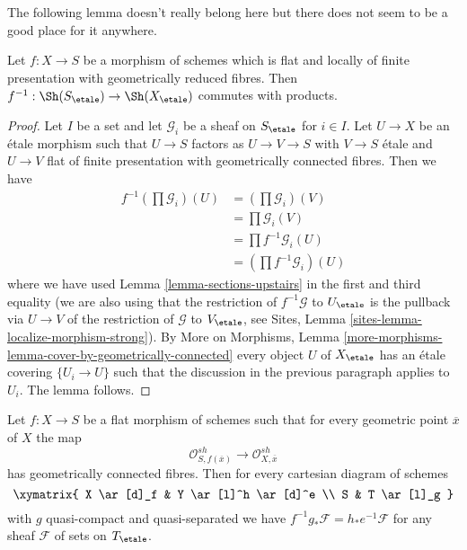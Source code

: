 \noindent
The following lemma doesn't really belong here but there does not
seem to be a good place for it anywhere.

\begin{lemma}
\label{lemma-fppf-reduced-fibres-pullback-products}
Let $f : X \to S$ be a morphism of schemes which is flat and
locally of finite presentation with geometrically reduced fibres.
Then $f^{-1} : \Sh(S_\etale) \to \Sh(X_\etale)$ commutes
with products.
\end{lemma}

\begin{proof}
Let $I$ be a set and let $\mathcal{G}_i$ be a sheaf on $S_\etale$
for $i \in I$.
Let $U \to X$ be an \'etale morphism such that $U \to S$ factors as
$U \to V \to S$ with $V \to S$ \'etale and $U \to V$ flat of finite
presentation with geometrically connected fibres. Then we have
\begin{align*}
f^{-1}(\prod \mathcal{G}_i)(U)
& =
(\prod \mathcal{G}_i)(V) \\
& =
\prod \mathcal{G}_i(V) \\
& =
\prod f^{-1}\mathcal{G}_i(U) \\
& =
(\prod f^{-1}\mathcal{G}_i)(U)
\end{align*}
where we have used Lemma \ref{lemma-sections-upstairs}
in the first and third equality
(we are also using that the restriction of $f^{-1}\mathcal{G}$
to $U_\etale$ is the pullback via $U \to V$ of the restriction of
$\mathcal{G}$ to $V_\etale$, see
Sites, Lemma \ref{sites-lemma-localize-morphism-strong}).
By More on Morphisms, Lemma
\ref{more-morphisms-lemma-cover-by-geometrically-connected}
every object $U$ of $X_\etale$ has an \'etale covering
$\{U_i \to U\}$ such that the discussion in the previous
paragraph applies to $U_i$. The lemma follows.
\end{proof}

\begin{lemma}
\label{lemma-base-change-f-star}
Let $f : X \to S$ be a flat morphism of schemes such
that for every geometric point $\overline{x}$ of $X$ the map
$$
\mathcal{O}_{S, f(\overline{x})}^{sh}
\longrightarrow
\mathcal{O}_{X, \overline{x}}^{sh}
$$
has geometrically connected fibres. Then for every
cartesian diagram of schemes
$$
\xymatrix{
X \ar[d]_f & Y \ar[l]^h \ar[d]^e \\
S & T \ar[l]_g
}
$$
with $g$ quasi-compact and quasi-separated we have
$f^{-1}g_*\mathcal{F} = h_*e^{-1}\mathcal{F}$
for any sheaf $\mathcal{F}$ of sets on $T_\etale$.
\end{lemma}

